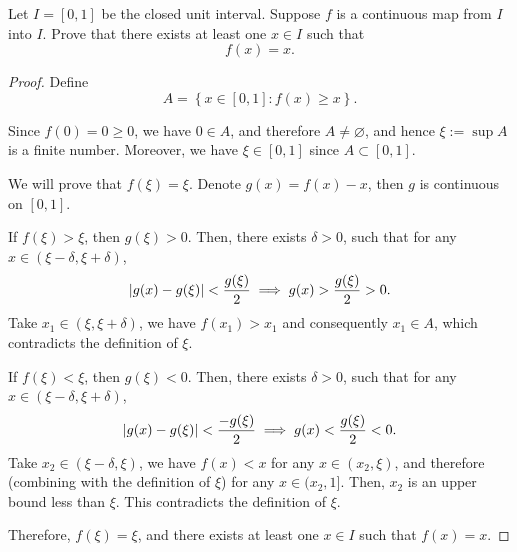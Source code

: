 \documentclass{article}
\begin{document}
\begin{problem}[4-14]
Let $I=[0,1]$ be the closed unit interval. Suppose $f$ is a continuous map from $I$ into $I$. Prove that there exists at least one $x\in I$ such that
\[
f(x)=x.
\]
\end{problem}

\begin{proof}
  Define
  \[ A=\left\{ x\in[0,1]:f(x)\ge x \right\}. \]\par
  Since \( f(0)=0\ge 0 \), we have \( 0\in A \), and therefore \( A\neq\varnothing \), and hence \( \xi:=\sup A \) is a finite number. Moreover, we have \( \xi\in[0,1] \) since \( A\subset[0,1] \).\par
  We will prove that \( f(\xi)=\xi \). Denote \( g(x)=f(x)-x \), then \( g \) is continuous on \( [0,1] \). \par
  If \( f(\xi)>\xi \), then \( g(\xi)>0 \). Then, there exists \( \delta>0 \), such that for any \( x\in(\xi-\delta,\xi+\delta) \), 
  \[ \left|g(x)-g(\xi)\right|<\frac{g(\xi)}{2}\implies g(x)>\frac{g(\xi)}{2}>0. \]
  Take \( x_1\in(\xi,\xi+\delta) \), we have \( f(x_1)>x_1 \) and consequently \( x_1\in A \), which contradicts the definition of \( \xi \). \par
  If \( f(\xi)<\xi \), then \( g(\xi)<0 \). Then, there exists \( \delta>0 \), such that for any \( x\in(\xi-\delta,\xi+\delta) \),
  \[ \left|g(x)-g(\xi)\right|<\frac{-g(\xi)}{2}\implies g(x)<\frac{g(\xi)}{2}<0. \]
  Take \( x_2\in(\xi-\delta,\xi) \), we have \( f(x)<x \) for any \( x\in(x_2,\xi) \), and therefore (combining with the definition of \( \xi \)) for any \( x\in(x_2,1] \). Then, \( x_2 \) is an upper bound less than \( \xi \). This contradicts the definition of \( \xi \). \par
  Therefore, \( f(\xi)=\xi \), and there exists at least one \( x\in I \) such that \( f(x)=x \).
\end{proof}
\end{document}
